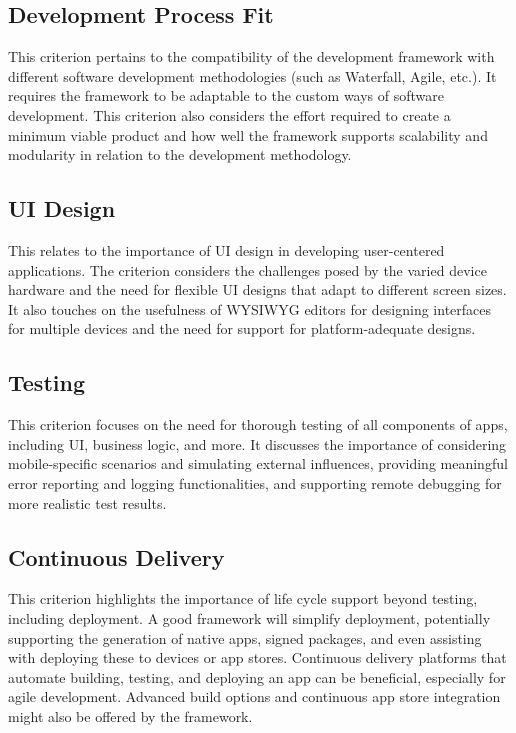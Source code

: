 \subsection{Development Process Fit}
This criterion pertains to the compatibility of the development framework with different software development methodologies (such as Waterfall, Agile, etc.). It requires the framework to be adaptable to the custom ways of software development. This criterion also considers the effort required to create a minimum viable product and how well the framework supports scalability and modularity in relation to the development methodology.

\subsection{UI Design}
This relates to the importance of UI design in developing user-centered applications. The criterion considers the challenges posed by the varied device hardware and the need for flexible UI designs that adapt to different screen sizes. It also touches on the usefulness of WYSIWYG editors for designing interfaces for multiple devices and the need for support for platform-adequate designs.

\subsection{Testing}
This criterion focuses on the need for thorough testing of all components of apps, including UI, business logic, and more. It discusses the importance of considering mobile-specific scenarios and simulating external influences, providing meaningful error reporting and logging functionalities, and supporting remote debugging for more realistic test results.

\subsection{Continuous Delivery}
This criterion highlights the importance of life cycle support beyond testing, including deployment. A good framework will simplify deployment, potentially supporting the generation of native apps, signed packages, and even assisting with deploying these to devices or app stores. Continuous delivery platforms that automate building, testing, and deploying an app can be beneficial, especially for agile development. Advanced build options and continuous app store integration might also be offered by the framework.

